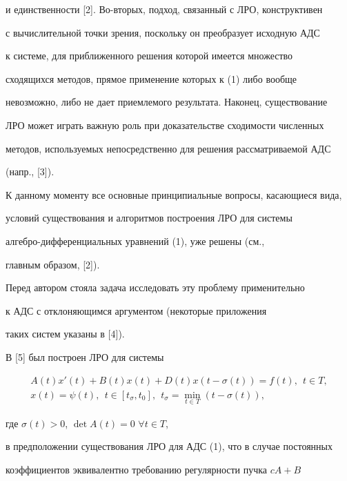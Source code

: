 и единственности [2]. Во-вторых, подход, связанный с ЛРО, конструктивен


с вычислительной точки зрения, поскольку он преобразует исходную АДС


к системе, для приближенного решения которой имеется множество


сходящихся методов, прямое применение которых к (1) либо вообще


невозможно, либо не дает приемлемого результата. Наконец, существование


ЛРО может играть важную роль при доказательстве сходимости численных


методов, используемых непосредственно для решения рассматриваемой АДС


(напр., [3]).





К данному моменту все основные принципиальные вопросы, касающиеся вида,


условий существования и алгоритмов построения ЛРО для системы


алгебро-дифференциальных уравнений (1), уже решены (см.,


главным образом, [2]).





Перед автором стояла задача исследовать эту проблему применительно


к АДС с отклоняющимся аргументом (некоторые приложения 


таких систем указаны в [4]).


В [5] был построен ЛРО для системы


\begin{gather*}


A(t)x'(t) +B(t)x(t)+D(t)x(t-\sigma(t))=f(t),\ \ t \in T, \\


%


x(t)=\psi (t),\ \ t \in [t_{\sigma } ,t_0],\ \ t_{\sigma }=\min_{t \in T}


(t-\sigma (t)),


\end{gather*}


где $\sigma (t) >0$, $\det A(t) = 0$\; $\forall t \in T$,


в предположении существования ЛРО для АДС (1), что в случае постоянных


коэффициентов эквивалентно требованию регулярности пучка $cA+B$


